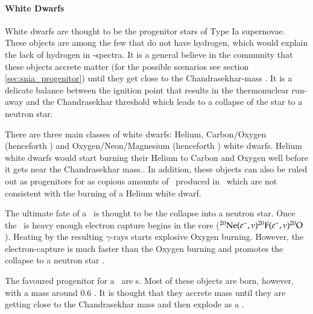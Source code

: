 \paragraph{White Dwarfs}
White dwarfs are thought to be the progenitor stars of Type Ia supernovae. These objects are among the few that do not have hydrogen, which would explain the lack of hydrogen in \snia-spectra. It is a general believe in the community that these objects accrete matter (for the possible scenarios see section \ref{sec:snia_progenitor}) until they get close to the Chandrasekhar-mass \citep{1931ApJ....74...81C}. It is a delicate balance between the ignition point that results in the thermonuclear run-away and the Chandrasekhar threshold which leads to a collapse of the star to a neutron star.
 
There are three main classes of white dwarfs: Helium, Carbon/Oxygen (henceforth \cowd) and Oxygen/Neon/Magnesium (henceforth \onemgwd) white dwarfs. Helium white dwarfs would start burning their Helium to Carbon and Oxygen well before it gets near the Chandrasekhar mass.. In addition, these objects can also be ruled out as progenitors for \sneia as copious amounts of \ige\ produced in \sneia\, which are not consistent with the burning of a Helium white dwarf. 

The ultimate fate of a \onemgwd\ is thought to be the collapse into a neutron star. Once the \onemgwd\ is heavy enough electron capture begins in the core ($\Ne(e^-,\nu)\F[20](e^-,\nu)\Ox[20]$). Heating by the resulting $\gamma$-rays starts explosive Oxygen burning. However, the electron-capture is much faster than the Oxygen burning and promotes the collapse to a neutron star \citep{1991ApJ...367L..19N, 2005A&A...435..231G}. 

The favoured progenitor for a \snia\  are \cowd s. Most of these objects are born, however, with a mass around 0.6 \msun \citep{2007MNRAS.375.1315K}. It is thought that they accrete mass until they are getting close to the Chandrasekhar mass and then explode as a \snia.

